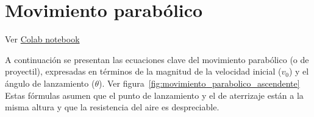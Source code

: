 \documentclass[11pt,a4paper]{book}
\begin{document}
\section{Movimiento parabólico}
Ver \href{https://colab.research.google.com/drive/1YMC00LP9HcuapJtmcpAcivhiywmEcPwo?usp=sharing}{Colab notebook}



A continuación se presentan las ecuaciones clave del movimiento parabólico (o de proyectil), expresadas en términos de la magnitud de la velocidad inicial ($v_0$) y el ángulo de lanzamiento ($\theta$). Ver figura~\ref{fig:movimiento_parabolico_ascendente} Estas fórmulas asumen que el punto de lanzamiento y el de aterrizaje están a la misma altura y que la resistencia del aire es despreciable.

\end{document}
